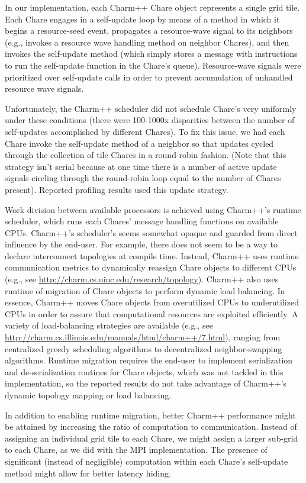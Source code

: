 In our implementation, each Charm++ Chare object represents a single grid tile.
Each Chare engages in a self-update loop by means of a method in which it begins a resource-seed event, propagates a resource-wave signal to its neighbors (e.g., invokes a resource wave handling method on neighbor Chares), and then invokes the self-update method (which simply stores a message with instructions to run the self-update function in the Chare's queue).
Resource-wave signals were prioritized over self-update calls in order to prevent accumulation of unhandled resource wave signals.

Unfortunately, the Charm++ scheduler did not schedule Chare's very uniformly under these conditions (there were 100-1000x disparities between the number of self-updates accomplished by different Chares).
To fix this issue, we had each Chare invoke the self-update method of a neighbor so that updates cycled through the collection of tile Chares in a round-robin fashion.
(Note that this strategy isn't serial because at one time there is a number of active update signals circling through the round-robin loop equal to the number of Chares present).
Reported profiling results used this update strategy.

Work division between available processors is achieved using Charm++'s runtime scheduler, which runs each Chares' message handling functions on available CPUs.
Charm++'s scheduler's seems somewhat opaque and guarded from direct influence by the end-user.
For example, there does not seem to be a way to declare interconnect topologies at compile time.
Instead, Charm++ uses runtime communication metrics to dynamically reassign Chare objects to different CPUs (e.g., see \url{http://charm.cs.uiuc.edu/research/topology}).
Charm++ also uses runtime of migration of Chare objects to perform dynamic load balancing.
In essence, Charm++ moves Chare objects from overutilized CPUs to underutilized CPUs in order to assure that computational resources are exploited efficiently.
A variety of load-balancing strategies are available (e.g., see \url{http://charm.cs.illinois.edu/manuals/html/charm++/7.html}), ranging from centralized greedy scheduling algorithms to decentralized neighbor-swapping algorithms.
Runtime migration requires the end-user to implement serialization and de-serialization routines for Chare objects, which was not tackled in this implementation, so the reported results do not take advantage of Charm++'s dynamic topology mapping or load balancing.

In addition to enabling runtime migration, better Charm++ performance might be attained by increasing the ratio of computation to communication.
Instead of assigning an individual grid tile to each Chare, we might assign a larger sub-grid to each Chare, as we did with the MPI implementation.
The presence of significant (instead of negligible) computation within each Chare's self-update method might allow for better latency hiding.


